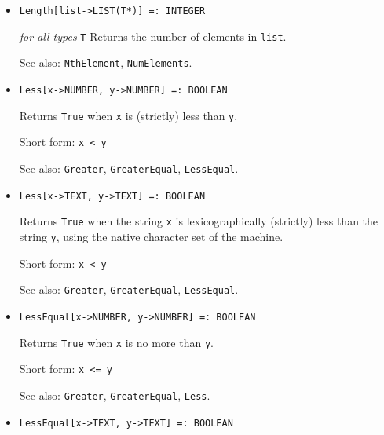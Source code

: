 \begin{itemize}
\item{}
\protect \large \begin{verbatim}
Length[list->LIST(T*)] =: INTEGER
\end{verbatim}\normalsize

{\it for all types} {\tt T}
\bd
Returns the number of elements in \verb+list+.
\item
[See also:] \verb+NthElement+, \verb+NumElements+.
\ed

\item{}
\protect \large \begin{verbatim}
Less[x->NUMBER, y->NUMBER] =: BOOLEAN 
\end{verbatim}\normalsize

\bd
Returns \verb+True+ when \verb+x+ is (strictly) less than \verb+y+.
\item [Short form:] \verb+x < y+
\item [See also:] \verb+Greater+, \verb+GreaterEqual+, \verb+LessEqual+.
\ed

\item{}
\protect \large \begin{verbatim}
Less[x->TEXT, y->TEXT] =: BOOLEAN 
\end{verbatim}\normalsize

\bd
Returns \verb+True+ when the string \verb+x+ is lexicographically (strictly)
less than
the string \verb+y+, using the native character set of the machine.
\item [Short form:] \verb+x < y+
\item [See also:] \verb+Greater+, \verb+GreaterEqual+, \verb+LessEqual+.
\ed

\item{}
\protect \large \begin{verbatim}
LessEqual[x->NUMBER, y->NUMBER] =: BOOLEAN 
\end{verbatim}\normalsize

\bd
Returns \verb+True+ when \verb+x+ is no more than \verb+y+.
\item [Short form:] \verb+x <= y+
\item [See also:] \verb+Greater+, \verb+GreaterEqual+, \verb+Less+.
\ed

\item{}
\protect \large \begin{verbatim}
LessEqual[x->TEXT, y->TEXT] =: BOOLEAN 
\end{verbatim}\normalsize


\end{itemize}
